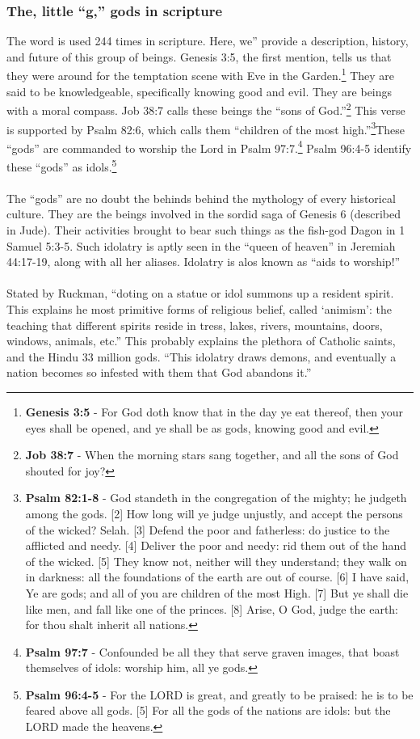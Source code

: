 \subsubsection{The, little ``g,'' gods in scripture}

The word is used 244 times in scripture. Here, we'' provide a description, history, and future of this group of beings.  Genesis 3:5, the first mention, tells us that they were around for the temptation scene with Eve in the Garden.\footnote{\textbf{Genesis 3:5} - For God doth know that in the day ye eat thereof, then your eyes shall be opened, and ye shall be as gods, knowing good and evil.} They are said to be knowledgeable, specifically knowing good and evil. They are beings with a  moral compass. Job 38:7 calls these beings the ``sons of God.''\footnote{\textbf{Job 38:7} -  When the morning stars sang together, and all the sons of God shouted for joy?} This verse is supported by Psalm 82:6, which calls them ``children of the most high.''\footnote{\textbf{Psalm 82:1-8} - God standeth in the congregation of the mighty; he judgeth among the gods. [2] How long will ye judge unjustly, and accept the persons of the wicked? Selah. [3] Defend the poor and fatherless: do justice to the afflicted and needy. [4] Deliver the poor and needy: rid them out of the hand of the wicked. [5] They know not, neither will they understand; they walk on in darkness: all the foundations of the earth are out of course. [6] I have said, Ye are gods; and all of you are children of the most High. [7] But ye shall die like men, and fall like one of the princes. [8] Arise, O God, judge the earth: for thou shalt inherit all nations.}These ``gods'' are commanded to worship the Lord in Psalm 97:7.\footnote{\textbf{Psalm 97:7} - Confounded be all they that serve graven images, that boast themselves of idols: worship him, all ye gods.} Psalm 96:4-5 identify these ``gods'' as idols.\footnote{\textbf{Psalm 96:4-5} - For the LORD is great, and greatly to be praised: he is to be feared above all gods. [5] For all the gods of the nations are idols: but the LORD made the heavens.}\\
\\
\noindent The ``gods'' are no doubt the behinds behind the mythology of every historical culture. They are the beings involved in the sordid saga of Genesis 6 (described in Jude).  Their activities brought to bear such things as the fish-god Dagon in 1 Samuel 5:3-5. Such idolatry is aptly seen in the ``queen of heaven'' in Jeremiah 44:17-19, along with all her aliases. Idolatry is alos known as ``aids to worship!''\\
\\
\noindent Stated by Ruckman, ``doting on a statue or idol summons up a resident spirit. This explains he most primitive forms of religious belief, called `animism': the teaching that different spirits reside in tress, lakes, rivers, mountains, doors, windows, animals, etc.'' This probably explains the plethora of Catholic saints, and the Hindu 33 million gods. ``This idolatry draws demons, and eventually a nation becomes so infested with them that God abandons it.'' \cite{Ruckman1992PsalmsV2}
